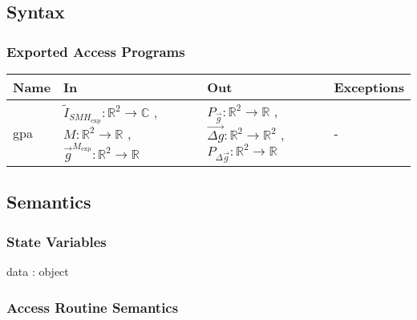 \documentclass[12pt, titlepage]{article}
\begin{document}
\subsection{Syntax}

\subsubsection{Exported Access Programs}

\begin{center}
\begin{tabular}{p{2cm} p{4cm} p{4cm} p{2cm}}
\hline
\textbf{Name} & \textbf{In} & \textbf{Out} & \textbf{Exceptions} \\
\hline
gpa & $\widetilde{I}_{\mathit{SMH}_{\text{exp}}}:\mathbb{R}^2\rightarrow\mathbb{C}$ , $M:\mathbb{R}^2\rightarrow\mathbb{R}$ , $\overrightarrow{g}^{M_{\text{exp}}} :\mathbb{R}^2\rightarrow\mathbb{R}$ & $P_{\vec{g}}:\mathbb{R}^2\rightarrow\mathbb{R}$ , $\overrightarrow{\Delta g}:\mathbb{R}^2\rightarrow\mathbb{R}^2$ , $P_{\Delta \vec{g}}:\mathbb{R}^2\rightarrow\mathbb{R}$ & - \\
\hline
\end{tabular}
\end{center}

\subsection{Semantics}

\subsubsection{State Variables}

data : object

\subsubsection{Access Routine Semantics}
\end{document}
